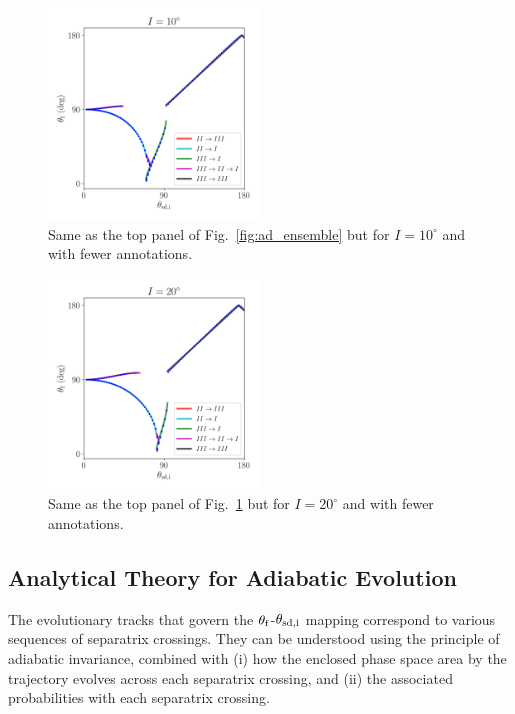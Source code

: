 \documentclass[
        fleqn,
        usenatbib,
    ]{mnras}
\begin{document}
\begin{figure}
    \centering
    \includegraphics[width=0.5\textwidth]{plots_diskdisp/3_ensemble_10_35.png}
    \caption{Same as the top panel of Fig.~\ref{fig:ad_ensemble} but for $I =
    10^\circ$ and with fewer annotations.}\label{fig:3_ensemble_10_35}
\end{figure}
\begin{figure}
    \centering
    \includegraphics[width=0.5\textwidth]{plots_diskdisp/3_ensemble_20_35.png}
    \caption{Same as the top panel of Fig.~\ref{fig:3_ensemble_10_35} but for $I
    = 20^\circ$ and with fewer annotations.}\label{fig:3_ensemble_20_35}
\end{figure}

\subsection{Analytical Theory for Adiabatic Evolution}\label{ss:zone_transitions}

The evolutionary tracks that govern the $\theta_{\rm f}$-$\theta_{\rm sd, i}$
mapping correspond to various sequences of separatrix crossings. They can be
understood using the principle of adiabatic invariance, combined with (i) how
the enclosed phase space area by the trajectory evolves across each separatrix
crossing, and (ii) the associated probabilities with each separatrix crossing.
\end{document}
